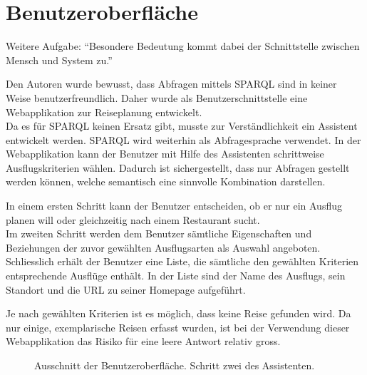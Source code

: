 \section{Benutzeroberfläche}
\label{sec:loesung_gui}
Weitere Aufgabe: ``Besondere Bedeutung kommt dabei der Schnittstelle zwischen Mensch und System zu.''~\cite{Aufgabenstellung}

Den Autoren wurde bewusst, dass Abfragen mittels SPARQL sind in keiner Weise benutzerfreundlich. Daher wurde als Benutzerschnittstelle eine Webapplikation zur Reiseplanung entwickelt.\\
Da es für SPARQL keinen Ersatz gibt, musste zur Verständlichkeit ein Assistent entwickelt werden. SPARQL wird weiterhin als Abfragesprache verwendet. 
In der Webapplikation kann der Benutzer mit Hilfe des Assistenten schrittweise Ausflugskriterien wählen. Dadurch ist sichergestellt, dass nur Abfragen gestellt werden können, welche semantisch eine sinnvolle Kombination darstellen.

In einem ersten Schritt kann der Benutzer entscheiden, ob er nur ein Ausflug planen will oder gleichzeitig nach einem Restaurant sucht.\\
Im zweiten Schritt werden dem Benutzer sämtliche Eigenschaften und Beziehungen der zuvor gewählten Ausflugsarten als Auswahl angeboten.\\
Schliesslich erhält der Benutzer eine Liste, die sämtliche den gewählten Kriterien entsprechende Ausflüge enthält. In der Liste sind der Name des Ausflugs, sein Standort und die URL zu seiner Homepage aufgeführt.

Je nach gewählten Kriterien ist es möglich, dass keine Reise gefunden wird. Da nur einige, exemplarische Reisen erfasst wurden, ist bei der Verwendung dieser Webapplikation das Risiko für eine leere Antwort relativ gross.
\begin{figure}[H]
\centering {}
\caption{Ausschnitt der Benutzeroberfläche. Schritt zwei des Assistenten.\label{fig:gui}\protect\footnotemark}
\end{figure}
